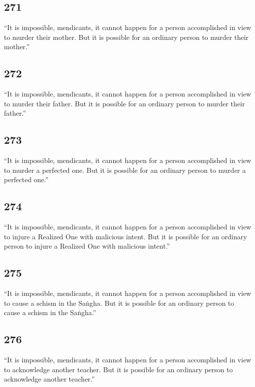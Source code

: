 \documentclass[12pt,openany]{book}%
\begin{document}
\subsection*{271 }

“It is impossible, mendicants, it cannot happen for a person accomplished in view to murder their mother. But it is possible for an ordinary person to murder their mother.” 

\subsection*{272 }

“It is impossible, mendicants, it cannot happen for a person accomplished in view to murder their father. But it is possible for an ordinary person to murder their father.” 

\subsection*{273 }

“It is impossible, mendicants, it cannot happen for a person accomplished in view to murder a perfected one. But it is possible for an ordinary person to murder a perfected one.” 

\subsection*{274 }

“It is impossible, mendicants, it cannot happen for a person accomplished in view to injure a Realized One with malicious intent. But it is possible for an ordinary person to injure a Realized One with malicious intent.” 

\subsection*{275 }

“It is impossible, mendicants, it cannot happen for a person accomplished in view to cause a schism in the \textsanskrit{Saṅgha}. But it is possible for an ordinary person to cause a schism in the \textsanskrit{Saṅgha}.” 

\subsection*{276 }

“It is impossible, mendicants, it cannot happen for a person accomplished in view to acknowledge another teacher. But it is possible for an ordinary person to acknowledge another teacher.” 
\end{document}
